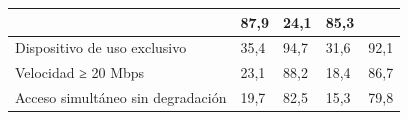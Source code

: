 \begin{table}[!ht]
{\begin{tabular}{@{}lllll@{}}
        & 
        
        87,9
       
        & 
        
        24,1
       
        & 
        
        85,3
       
        \\
    \midrule
    
        
        Dispositivo de uso exclusivo
       
        & 
        
        35,4
       
        & 
        
        94,7
       
        & 
        
        31,6
       
        & 
        
        92,1
       
        \\
    \midrule
    
        
        Velocidad ≥ 20 Mbps
       
        & 
        
        23,1
       
        & 
        
        88,2
       
        & 
        
        18,4
       
        & 
        
        86,7
       
        \\
    \midrule
    
        
        Acceso simultáneo sin degradación
       
        & 
        
        19,7
       
        & 
        
        82,5
       
        & 
        
        15,3
       
        & 
        
        79,8
       
        \\
    \bottomrule
  \end{tabular}
}%
\label{tbl-1}
\end{table}


